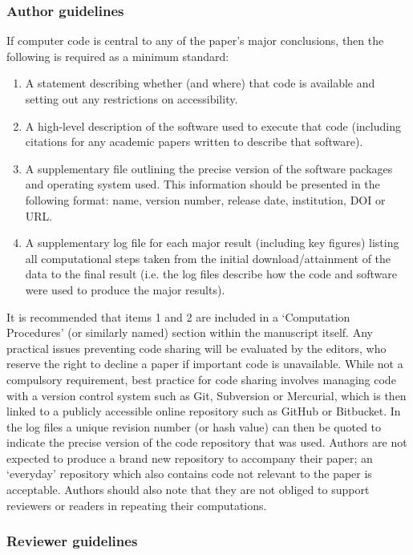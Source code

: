 \subsubsection{Author guidelines}

If computer code is central to any of the paper's major conclusions, then the following is required as a minimum standard: 
\begin{enumerate}
\item A statement describing whether (and where) that code is available and setting out any restrictions on accessibility. 
\item A high-level description of the software used to execute that code (including citations for any academic papers written to describe that software).
\item A supplementary file outlining the precise version of the software packages and operating system used. This information should be presented in the following format: name, version number, release date, institution, DOI or URL.
\item A supplementary log file for each major result (including key figures) listing all computational steps taken from the initial download/attainment of the data to the final result (i.e. the log files describe how the code and software were used to produce the major results). 
\end{enumerate}

It is recommended that items 1 and 2 are included in a `Computation Procedures' (or similarly named) section within the manuscript itself. Any practical issues preventing code sharing will be evaluated by the editors, who reserve the right to decline a paper if important code is unavailable. While not a compulsory requirement, best practice for code sharing involves managing code with a version control system such as Git, Subversion or Mercurial, which is then linked to a publicly accessible online repository such as GitHub or Bitbucket. In the log files a unique revision number (or hash value) can then be quoted to indicate the precise version of the code repository that was used. Authors are not expected to produce a brand new repository to accompany their paper; an `everyday' repository which also contains code not relevant to the paper is acceptable. Authors should also note that they are not obliged to support reviewers or readers in repeating their computations.

\subsubsection{Reviewer guidelines}

